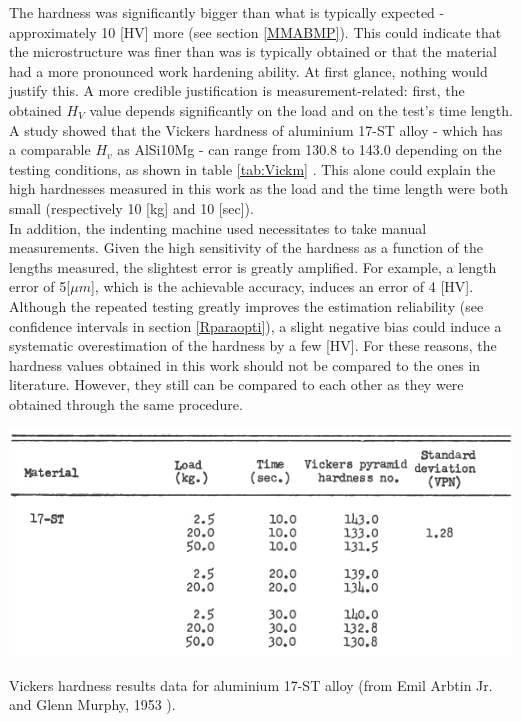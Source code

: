 The hardness was significantly bigger than what is typically expected - approximately 10 [HV] more (see section \ref{MMABMP}). This could indicate that the microstructure was finer than was is typically obtained or that the material had a more pronounced work hardening ability. At first glance, nothing would justify this. A more credible justification is measurement-related: first, the obtained $H_V$ value depends significantly on the load and on the test's time length. A study showed that the Vickers hardness of aluminium 17-ST alloy - which has a comparable $H_v$ as AlSi10Mg - can range from 130.8 to 143.0 depending on the testing conditions, as shown in table \ref{tab:Vickm} \parencite{Arbtin}. This alone could explain the high hardnesses measured in this work as the load and the time length were both small (respectively 10 [kg] and 10 [sec]).\\

In addition, the indenting machine used necessitates to take manual measurements. Given the high sensitivity of the hardness as a function of the lengths measured, the slightest error is greatly amplified. For example, a length error of 5[$\mu m$], which is the achievable accuracy, induces an error of 4 [HV]. Although the repeated testing greatly improves the estimation reliability (see confidence intervals in section \ref{Rparaopti}), a slight negative bias could induce a systematic overestimation of the hardness by a few [HV]. For these reasons, the hardness values obtained in this work should not be compared to the ones in literature. However, they still can be compared to each other as they were obtained through the same procedure.\\

\begin{table}[ht]
		\centering
			\includegraphics[scale=0.90]{Images/Vickm}
			\decoRule
		\caption[Vickers hardness results data for aluminium 17-ST alloy.]{Vickers hardness results data for aluminium 17-ST alloy (from Emil Arbtin Jr. and Glenn Murphy, 1953 \parencite{Arbtin}).}
		\label{tab:Vickm}
\end{table}


